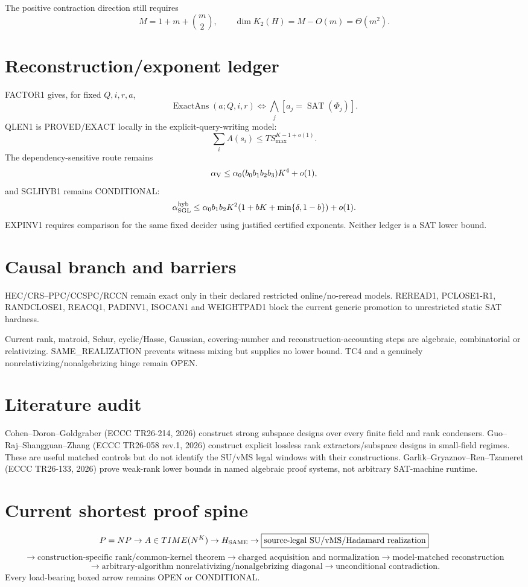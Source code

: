 \documentclass[11pt]{article}
\begin{document}
The positive contraction direction still requires
\[
M=1+m+\binom m2,\qquad \dim K_2(H)=M-O(m)=\Theta(m^2).
\]

\section*{Reconstruction/exponent ledger}
FACTOR1 gives, for fixed \(Q,i,r,a\),
\[
\operatorname{ExactAns}(a;Q,i,r)\iff\bigwedge_j[a_j=\operatorname{SAT}(\Phi_j)].
\]
QLEN1 is PROVED/EXACT locally in the explicit-query-writing model:
\[
\sum_i A(s_i)\le T S_{\max}^{K-1+o(1)}.
\]
The dependency-sensitive route remains
\[
\alpha_{\rm V}\le\alpha_0(b_0b_1b_2b_3)K^4+o(1),
\]
and SGLHYB1 remains CONDITIONAL:
\[
\alpha_{\rm SGL}^{\rm hyb}\le
\alpha_0b_1b_2K^2(1+bK+\min\{\delta,1-b\})+o(1).
\]
EXPINV1 requires comparison for the same fixed decider using justified certified exponents. Neither ledger is a SAT lower bound.

\section*{Causal branch and barriers}
HEC/CRS--PPC/CCSPC/RCCN remain exact only in their declared restricted online/no-reread models. REREAD1, PCLOSE1-R1, RANDCLOSE1, REACQ1, PADINV1, ISOCAN1 and WEIGHTPAD1 block the current generic promotion to unrestricted static SAT hardness.

Current rank, matroid, Schur, cyclic/Hasse, Gaussian, covering-number and reconstruction-accounting steps are algebraic, combinatorial or relativizing. SAME\_REALIZATION prevents witness mixing but supplies no lower bound. TC4 and a genuinely nonrelativizing/nonalgebrizing hinge remain OPEN.

\section*{Literature audit}
Cohen--Doron--Goldgraber (ECCC TR26-214, 2026) construct strong subspace designs over every finite field and rank condensers. Guo--Raj--Shangguan--Zhang (ECCC TR26-058 rev.1, 2026) construct explicit lossless rank extractors/subspace designs in small-field regimes. These are useful matched controls but do not identify the SU/vMS legal windows with their constructions. Garlik--Gryaznov--Ren--Tzameret (ECCC TR26-133, 2026) prove weak-rank lower bounds in named algebraic proof systems, not arbitrary SAT-machine runtime.

\section*{Current shortest proof spine}
\[
P=NP\to A\in TIME(N^K)\to H_{\rm SAME}
\to\boxed{\text{source-legal SU/vMS/Hadamard realization}}
\]
\[
\to\boxed{\text{construction-specific rank/common-kernel theorem}}
\to\boxed{\text{charged acquisition and normalization}}
\to\boxed{\text{model-matched reconstruction}}
\]
\[
\to\boxed{\text{arbitrary-algorithm nonrelativizing/nonalgebrizing diagonal}}
\to\boxed{\text{unconditional contradiction}}.
\]
Every load-bearing boxed arrow remains OPEN or CONDITIONAL.
\end{document}
